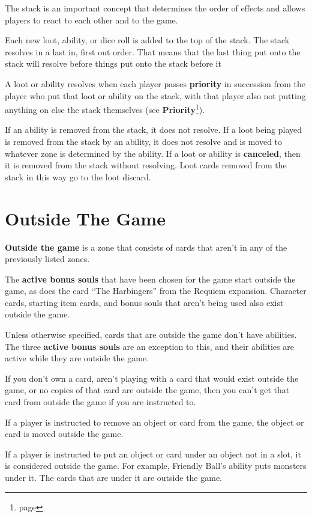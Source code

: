 \documentclass[a4paper, twoside]{report} %
\begin{document}
    The stack is an important concept that determines the order of effects and allows players to react to each other and to the game.

    Each new loot, ability, or dice roll is added to the top of the stack. The stack resolves in a last in, first out order. That means that the last thing put onto the stack will resolve before things put onto the stack before it

    A loot or ability resolves when each player passes \textbf{priority} in succession from the player who put that loot or ability on the stack, with that player also not putting anything on else the stack themselves (see \textbf{Priority}\footnote{page \pageref{priority}}).

    If an ability is removed from the stack, it does not resolve. If a loot being played is removed from the stack by an ability, it does not resolve and is moved to whatever zone is determined by the ability. If a loot or ability is \textbf{canceled}, then it is removed from the stack without resolving. Loot cards removed from the stack in this way go to the loot discard.

    \section{Outside The Game}
    \textbf{Outside the game} is a zone that consists of cards that aren’t in any of the previously listed zones.

    The \textbf{active bonus souls} that have been chosen for the game start outside the game, as does the card “The Harbingers” from the Requiem expansion. Character cards, starting item cards, and bonus souls that aren’t being used also exist outside the game.

    Unless otherwise specified, cards that are outside the game don’t have abilities. The three \textbf{active bonus souls} are an exception to this, and their abilities are active while they are outside the game.

    If you don’t own a card, aren’t playing with a card that would exist outside the game, or no copies of that card are outside the game, then you can’t get that card from outside the game if you are instructed to.

    If a player is instructed to remove an object or card from the game, the object or card is moved outside the game.

    If a player is instructed to put an object or card under an object not in a slot, it is considered outside the game. For example, Friendly Ball’s ability puts monsters under it. The cards that are under it are outside the game.
\end{document}
